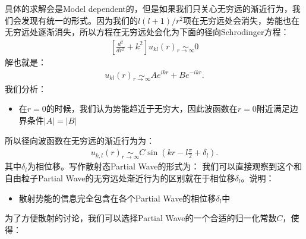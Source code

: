 \bigskip
{}

具体的求解会是Model dependent的，但是如果我们只关心无穷远的渐近行为，我们会发现有统一的形式。因为我们的$
l(l+1)/r^2 $项在无穷远处会消失，势能也在无穷远处逐渐消失，所以方程在无穷远处会化为下面的径向Schrodinger方程：
\begin{align}
  \left[\frac{d^2}{dr^2}+k^2\right]u_{kl}(r)\operatorname*{\sim}_{r\to\infty}0
\end{align}
解也就是：
\begin{align}
  u_{kl}(r)\underset{r\to\infty}{\sim}Ae^{ikr}+Be^{-ikr}.
\end{align}
我们分析：
\begin{itemize}
  \item 在$ r = 0 $的时候，我们认为势能趋近于无穷大，因此波函数在$ r = 0 $附近满足边界条件$ |A| = |B| $
\end{itemize}
所以径向波函数在无穷远的渐近行为为：
\begin{align}
  u_{k,l}(r)\operatorname*{\sim}_{r\to\infty}C\sin\left(kr-l\frac{\pi}{2}+\delta_l\right).
\end{align}
其中$ \delta_l $为相位移。写作散射态Partial Wave的形式为：
我们可以直接观察到这个和自由粒子Partial Wave的无穷远处渐近行为的区别就在于相位移$ \delta_l $。说明：
\begin{itemize}
  \item 散射势能的信息完全包含在各个Partial Wave的相位移$ \delta_l $中
\end{itemize}
为了方便散射的讨论，我们可以选择Partial Wave的一个合适的归一化常数$ C $，使得：

